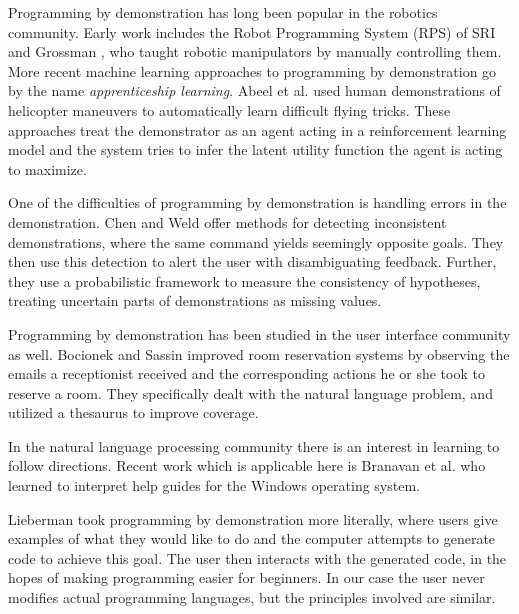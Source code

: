 \documentclass[letterpaper]{article}
\begin{document}
Programming by demonstration has long been popular in the robotics community.
Early work includes the Robot Programming System (RPS) of SRI \cite{SRIpbd} and
Grossman \cite{grossman}, who taught robotic manipulators by manually controlling them.
More recent machine learning approaches to programming by demonstration 
go by the name \emph{apprenticeship learning}.
Abeel et al. \cite{Abbeel:2004:ALV:1015330.1015430} used human demonstrations of helicopter maneuvers to automatically learn difficult flying tricks. These approaches treat the demonstrator as an agent
acting in a reinforcement learning model and the system tries to infer the latent utility function
the agent is acting to maximize.

One of the difficulties of programming by demonstration is handling errors in 
the demonstration. Chen and Weld \cite{Chen:2008:RED:1378773.1378794} offer methods for
detecting inconsistent demonstrations, where the same command yields seemingly opposite
goals. They then use this detection to alert the user with disambiguating feedback.
Further, they use a probabilistic framework to measure the consistency of hypotheses,
treating uncertain parts of demonstrations as missing values.

Programming by demonstration has been studied in the user interface community as well.
Bocionek and Sassin \cite{Bocionek:1993:DLA:865219} improved room reservation systems
by observing the emails a receptionist received and the corresponding actions
he or she took to reserve a room. They specifically dealt with the natural language problem,
and utilized a thesaurus to improve coverage.

In the natural language processing community there is an interest in learning to 
follow directions. Recent work which is applicable here is Branavan et al. 
\cite{DBLP:conf/acl/BranavanCZB09} who learned to interpret help guides for the 
Windows operating system. 

Lieberman \cite{lieberman2001} took programming by demonstration more literally, where users give examples
of what they would like to do and the computer attempts to generate code to 
achieve this goal. The user then interacts with the generated code, in the hopes
of making programming easier for beginners. In our case the user never 
modifies actual programming languages, but the principles involved are similar.
\end{document}
